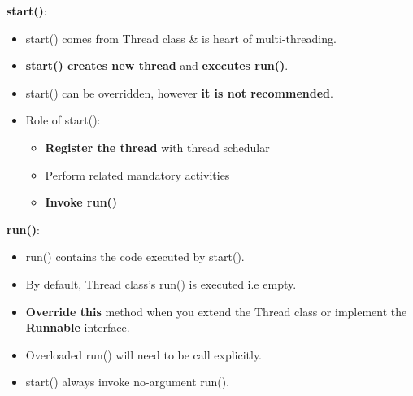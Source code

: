 \setlength{\columnsep}{3pt}
\begin{flushleft}

		\textbf{start()}:
		\begin{itemize}
			\item start() comes from Thread class \& is heart of multi-threading.
			\item \textbf{start() creates new thread} and \textbf{executes run()}.
			\item start() can be overridden, however \textbf{it is not recommended}.
			\item Role of start():
			\begin{itemize}
				\item \textbf{Register the thread} with thread schedular
				\item Perform related mandatory activities
				\item \textbf{Invoke run()}
			\end{itemize}
		\end{itemize}
	
		\textbf{run()}:
		\begin{itemize}
			\item run() contains the code executed by start().
			\item By default, Thread class's run() is executed i.e empty.
			\item \textbf{Override this} method when you extend the Thread class or implement the \textbf{Runnable} interface.
			\item Overloaded run() will need to be call explicitly.
			\item start() always invoke no-argument run().
		
			\bigskip

		\end{itemize}	



\end{flushleft}
